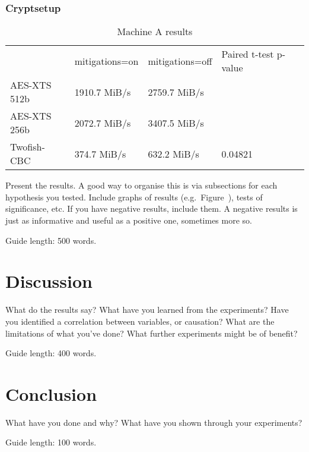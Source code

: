\documentclass{csfourzero}
\begin{document}
\subsubsection{Cryptsetup}
\begin{table}[h]
\centering
\begin{tabular}{|l|l|l|l|l}
\cline{1-4}
             & mitigations=on & mitigations=off & Paired t-test p-value &  \\ \cline{1-4}
AES-XTS 512b & 1910.7 MiB/s   & 2759.7 MiB/s    &         &  \\ \cline{1-4}
AES-XTS 256b & 2072.7 MiB/s   & 3407.5 MiB/s    &         &  \\ \cline{1-4}
Twofish-CBC  & 374.7 MiB/s    & 632.2 MiB/s     & 0.04821 &  \\ \cline{1-4}
\end{tabular}
\caption{Machine A results }
\label{tab:machines}
\end{table}

Present the results. A good way to organise this is via subsections
for each hypothesis you tested. Include graphs of results
(e.g.\ Figure~), tests of significance, etc. If you have
negative results, include them. A negative results is just as
informative and useful as a positive one, sometimes more so.


Guide length: 500 words.

\section{Discussion}
\label{sec:discuss}

What do the results say? What have you learned from the
experiments? Have you identified a correlation between variables, or
causation? What are the limitations of what you've done? What further
experiments might be of benefit?

Guide length: 400 words.

\section{Conclusion}
\label{sec:conc}

What have you done and why? What have you shown through your
experiments?

Guide length: 100 words.


\end{document}
